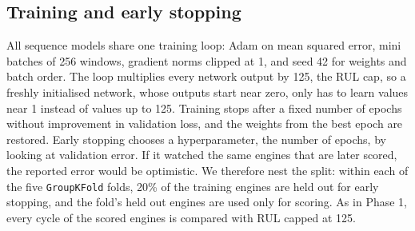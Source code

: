 \subsection{Training and early stopping}
All sequence models share one training loop: Adam on mean squared error,
mini batches of 256 windows, gradient norms clipped at 1, and seed 42 for
weights and batch order. The loop multiplies every network output by 125,
the RUL cap, so a freshly initialised network, whose outputs start near
zero, only has to learn values near 1 instead of values up to 125. Training stops after a fixed number of epochs
without improvement in validation loss, and the weights from the best epoch
are restored. Early stopping chooses a hyperparameter, the number of epochs,
by looking at validation error. If it watched the same engines that are
later scored, the reported error would be optimistic. We therefore nest the
split: within each of the five \texttt{GroupKFold} folds, 20\% of the
training engines are held out for early stopping, and the fold's held out
engines are used only for scoring. As in Phase 1, every cycle of the scored
engines is compared with RUL capped at 125.

